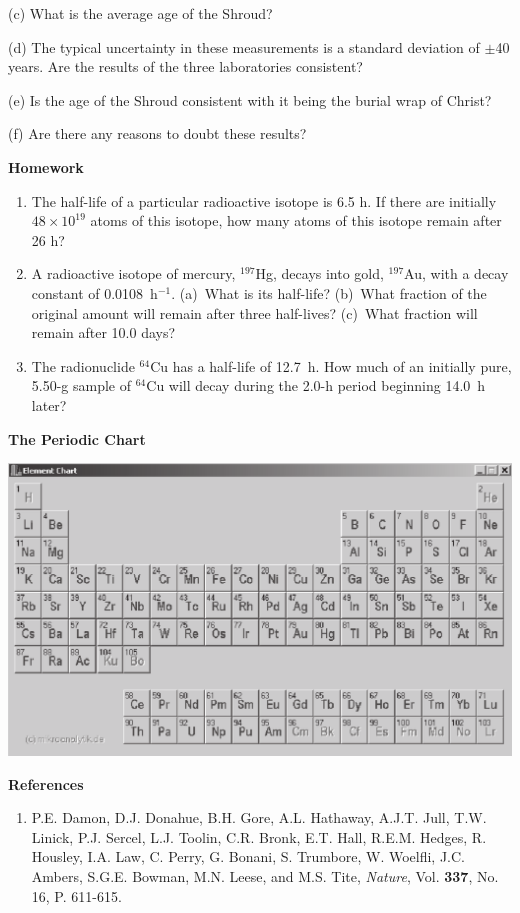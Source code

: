 \answerspace{3.5in}
(c) What is the average age of the Shroud? 
\answerspace{1in}

(d) The typical uncertainty in these measurements is a standard deviation
of \( \pm  \)40 years. Are the results of the three laboratories
consistent? 
\answerspace{1in}

\pagebreak
(e) Is the age of the Shroud consistent with it being the burial wrap
of Christ? 
\vspace{1in}

(f) Are there any reasons to doubt these results?
\vspace{1in}

\textbf{Homework} 

\begin{enumerate}
\item The half-life of a particular radioactive isotope is 6.5 h. If there
are initially $48 \times 10^{19}$ atoms of this isotope, how many
atoms of this isotope remain after 26 h? 
\item A radioactive isotope of mercury, \( ^{197} \)Hg, decays into gold,
\( ^{197} \)Au, with a decay constant of 0.0108~h\( ^{-1} \).
(a)~What is its half-life? (b)~What fraction of the original amount
will remain after three half-lives? (c)~What fraction will remain
after 10.0 days?
\item The radionuclide \( ^{64} \)Cu has a half-life of 12.7~h. How much
of an initially pure, 5.50-g sample of \( ^{64} \)Cu will decay during
the 2.0-h period beginning 14.0~h later? 
\end{enumerate}

\textbf{The Periodic Chart} 

\begin{center}
\includegraphics[width=5.5in]{radiocarbon_dating/pertable3_bw.pdf}
\end{center}

\textbf{References}

\begin{enumerate}
\item P.E. Damon, D.J. Donahue, B.H. Gore, A.L. Hathaway, A.J.T. Jull, T.W. Linick,
P.J. Sercel, L.J. Toolin, C.R. Bronk, E.T. Hall, R.E.M. Hedges, R. Housley,
I.A. Law, C. Perry, G. Bonani, S. Trumbore, W. Woelfli, J.C. Ambers, S.G.E. Bowman,
M.N. Leese, and M.S. Tite, \emph{Nature}, Vol. \textbf{337}, No. 16,
P. 611-615.\end{enumerate}


